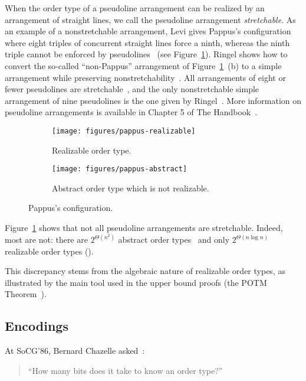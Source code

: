 When the order type of a pseudoline arrangement can be realized by an
arrangement of straight lines, we call the pseudoline arrangement
\emph{stretchable}.
%
As an example of a nonstretchable arrangement, Levi gives Pappus's
configuration where eight triples of concurrent straight lines force a ninth,
whereas the ninth triple cannot be enforced by pseudolines~\cite{Le26} (see
Figure~\ref{fig:pappus}).
%
Ringel shows how to convert the so-called ``non-Pappus'' arrangement of
Figure~\ref{fig:pappus}~(b) to a simple arrangement while preserving
nonstretchability~\cite{Ri56}.
%
All arrangements of eight or fewer pseudolines are stretchable~\cite{GP80}, and
the only nonstretchable simple arrangement of nine pseudolines is the one given
by Ringel~\cite{Ri89}.
%
More information on pseudoline arrangements is available in Chapter 5 of The
Handbook~\cite{Goo04}.

\begin{figure}
	\centering{}
    \begin{subfigure}[t]{0.5\textwidth}
		\centering{}
		\texttt{[image: figures/pappus-realizable]}
		\caption{Realizable order type.}
    \end{subfigure}%
    \begin{subfigure}[t]{0.5\textwidth}
		\centering{}
		\texttt{[image: figures/pappus-abstract]}
		\caption{Abstract order type which is not realizable.}
    \end{subfigure}
	\caption{Pappus's configuration.}\label{fig:pappus}
\end{figure}

Figure~\ref{fig:pappus} shows that not all pseudoline arrangements are
stretchable. Indeed, most are not: there are \(2^{\Theta(n^2)}\)
abstract order types~\cite{Fe96} and only \(2^{\Theta(n \log n)}\) realizable
order types ().
%

%
This discrepancy stems from the algebraic nature of realizable order types, as
illustrated by the main tool used in the upper bound proofs (the
POTM Theorem~\cite{Mi64,Th65,BPR06}).

\subsection{Encodings}%
\label{sec:problem:pol:encodings}

At SoCG'86, Bernard Chazelle asked~\cite{GP93}:
\begin{quotation}
``How many bits does it take to know an order type?''
\end{quotation}

